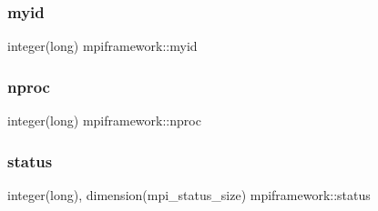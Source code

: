 \subsubsection{\texorpdfstring{myid}{myid}}
{\footnotesize\ttfamily integer(long) mpiframework\+::myid}

\mbox{\label{namespacempiframework_af70b38210cb3bcccdc873618ffb3de35}} 
\subsubsection{\texorpdfstring{nproc}{nproc}}
{\footnotesize\ttfamily integer(long) mpiframework\+::nproc}

\mbox{\label{namespacempiframework_ab7c6b211b6d67a29e8b7e2cefe97d5b2}} 
\subsubsection{\texorpdfstring{status}{status}}
{\footnotesize\ttfamily integer(long), dimension(mpi\+\_\+status\+\_\+size) mpiframework\+::status}

